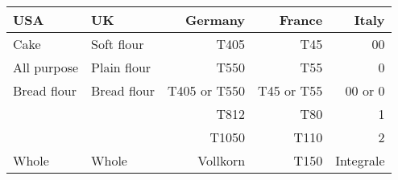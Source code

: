 \begin{tabular}{@{}llrrr@{}}
\toprule
\textbf{USA}  & \textbf{UK}  & {\textbf{Germany}} & {\textbf{France}} & {\textbf{Italy}} \\ \midrule
Cake         & Soft flour  &  T405            &  T45        & 00 \\ 
All purpose  & Plain flour &  T550            &  T55        & 0 \\ 
Bread flour  & Bread flour &  T405 or T550    &  T45 or T55 & 00 or 0 \\ 
             &             &  T812            &  T80        & 1 \\ 
             &             &  T1050           &  T110       & 2 \\ 
Whole        & Whole       &  Vollkorn        &  T150       & Integrale \\ \bottomrule
\end{tabular}
